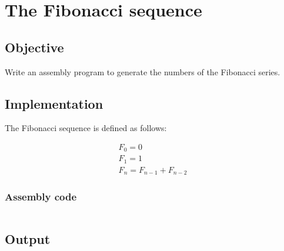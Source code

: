 \section{The Fibonacci sequence}

\subsection{Objective}
Write an assembly program to generate the numbers of the Fibonacci series.


\subsection{Implementation}

The Fibonacci sequence is defined as follows:

\begin{align*}
	F_0 = 0 \\
	F_1 = 1 \\
	F_n = F_{n-1} + F_{n-2}
\end{align*}

\subsubsection{Assembly code}

\inputminted[linenos, frame=single, breaklines]{asm}{./code/8086/fibonacci.asm}

\subsection{Output}

\pagebreak
